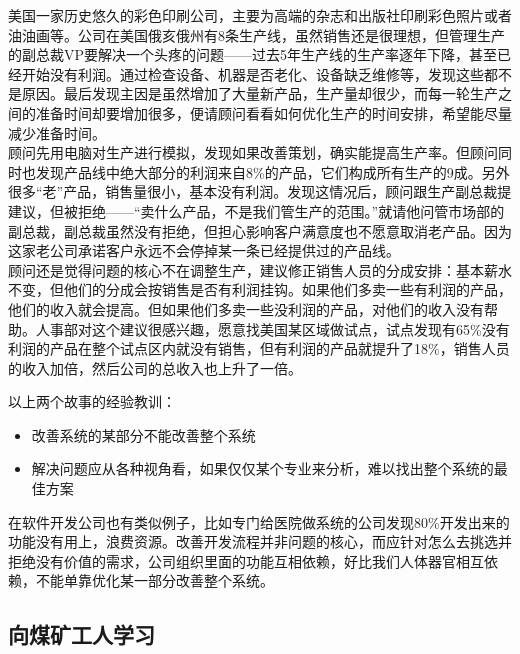 美国一家历史悠久的彩色印刷公司，主要为高端的杂志和出版社印刷彩色照片或者油油画等。公司在美国俄亥俄州有8条生产线，虽然销售还是很理想，但管理生产的副总裁VP要解决一个头疼的问题------过去5年生产线的生产率逐年下降，甚至已经开始没有利润。通过检查设备、机器是否老化、设备缺乏维修等，发现这些都不是原因。最后发现主因是虽然增加了大量新产品，生产量却很少，而每一轮生产之间的准备时间却要增加很多，便请顾问看看如何优化生产的时间安排，希望能尽量减少准备时间。\\
顾问先用电脑对生产进行模拟，发现如果改善策划，确实能提高生产率。但顾问同时也发现产品线中绝大部分的利润来自8\%的产品，它们构成所有生产的9成。另外很多``老''产品，销售量很小，基本没有利润。发现这情况后，顾问跟生产副总裁提建议，但被拒绝------``卖什么产品，不是我们管生产的范围。''就请他问管市场部的副总裁，副总裁虽然没有拒绝，但担心影响客户满意度也不愿意取消老产品。因为这家老公司承诺客户永远不会停掉某一条已经提供过的产品线。\\
顾问还是觉得问题的核心不在调整生产，建议修正销售人员的分成安排：基本薪水不变，但他们的分成会按销售是否有利润挂钩。如果他们多卖一些有利润的产品，他们的收入就会提高。但如果他们多卖一些没利润的产品，对他们的收入没有帮助。人事部对这个建议很感兴趣，愿意找美国某区域做试点，试点发现有65\%没有利润的产品在整个试点区内就没有销售，但有利润的产品就提升了18\%，销售人员的收入加倍，然后公司的总收入也上升了一倍。

\begin{description}
\item[]
\begin{description}
\tightlist
\item[]
-\/-\/-+++-\/-\/-
\end{description}
\end{description}

以上两个故事的经验教训：

\begin{itemize}
\tightlist
\item
  改善系统的某部分不能改善整个系统
\item
  解决问题应从各种视角看，如果仅仅某个专业来分析，难以找出整个系统的最佳方案
\end{itemize}

在软件开发公司也有类似例子，比如专门给医院做系统的公司发现80\%开发出来的功能没有用上，浪费资源。改善开发流程并非问题的核心，而应针对怎么去挑选并拒绝没有价值的需求，公司组织里面的功能互相依赖，好比我们人体器官相互依赖，不能单靠优化某一部分改善整个系统。

\hypertarget{ux5411ux7164ux77ffux5de5ux4ebaux5b66ux4e60}{%
\subsection{向煤矿工人学习}\label{ux5411ux7164ux77ffux5de5ux4ebaux5b66ux4e60}}

